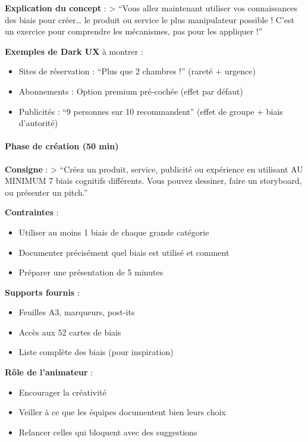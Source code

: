 \documentclass[
]{article}
\providecommand{\tightlist}{%
  \setlength{\itemsep}{0pt}\setlength{\parskip}{0pt}}
\begin{document}
\textbf{Explication du concept} : \textgreater{} ``Vous allez maintenant
utiliser vos connaissances des biais pour créer\ldots{} le produit ou
service le plus manipulateur possible ! C'est un exercice pour
comprendre les mécanismes, pas pour les appliquer !''

\textbf{Exemples de Dark UX} à montrer :

\begin{itemize}
\tightlist
\item
  Sites de réservation : ``Plus que 2 chambres !'' (rareté + urgence)
\item
  Abonnements : Option premium pré-cochée (effet par défaut)
\item
  Publicités : ``9 personnes sur 10 recommandent'' (effet de groupe +
  biais d'autorité)
\end{itemize}

\paragraph{Phase de création (50
min)}\label{phase-de-cruxe9ation-50-min}

\textbf{Consigne} : \textgreater{} ``Créez un produit, service,
publicité ou expérience en utilisant AU MINIMUM 7 biais cognitifs
différents. Vous pouvez dessiner, faire un storyboard, ou présenter un
pitch.''

\textbf{Contraintes} :

\begin{itemize}
\tightlist
\item
  Utiliser au moins 1 biais de chaque grande catégorie
\item
  Documenter précisément quel biais est utilisé et comment
\item
  Préparer une présentation de 5 minutes
\end{itemize}

\textbf{Supports fournis} :

\begin{itemize}
\tightlist
\item
  Feuilles A3, marqueurs, post-its
\item
  Accès aux 52 cartes de biais
\item
  Liste complète des biais (pour inspiration)
\end{itemize}

\textbf{Rôle de l'animateur} :

\begin{itemize}
\tightlist
\item
  Encourager la créativité
\item
  Veiller à ce que les équipes documentent bien leurs choix
\item
  Relancer celles qui bloquent avec des suggestions
\end{itemize}
\end{document}
